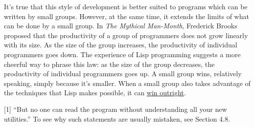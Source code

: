 It's true that this style of development is better suited to programs
which can be written by small groups. However, at the same time, it
extends the limits of what can be done by a small group. In \emph{The
Mythical Man-Month}, Frederick Brooks proposed that the productivity of
a group of programmers does not grow linearly with its size. As the size
of the group increases, the productivity of individual programmers goes
down. The experience of Lisp programming suggests a more cheerful way to
phrase this law: as the size of the group decreases, the productivity of
individual programmers goes up. A small group wins, relatively speaking,
simply because it's smaller. When a small group also takes advantage of
the techniques that Lisp makes possible, it can \href{avg.html}{win
outright}.

{[}1{]} ``But no one can read the program without understanding all your
new utilities.'' To see why such statements are usually mistaken, see
Section 4.8.
